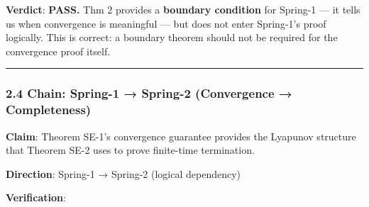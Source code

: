 \documentclass[
  12pt,
]{ctexart}
\begin{document}
\textbf{Verdict}: \textbf{PASS.} Thm 2 provides a \textbf{boundary
condition} for Spring-1 --- it tells us when convergence is meaningful
--- but does not enter Spring-1's proof logically. This is correct: a
boundary theorem should not be required for the convergence proof
itself.

\begin{center}\rule{0.5\linewidth}{0.5pt}\end{center}

\subsubsection{2.4 Chain: Spring-1 → Spring-2 (Convergence →
Completeness)}\label{chain-spring-1-spring-2-convergence-completeness}

\textbf{Claim}: Theorem SE-1's convergence guarantee provides the
Lyapunov structure that Theorem SE-2 uses to prove finite-time
termination.

\textbf{Direction}: Spring-1 → Spring-2 (logical dependency)

\textbf{Verification}:
\end{document}
